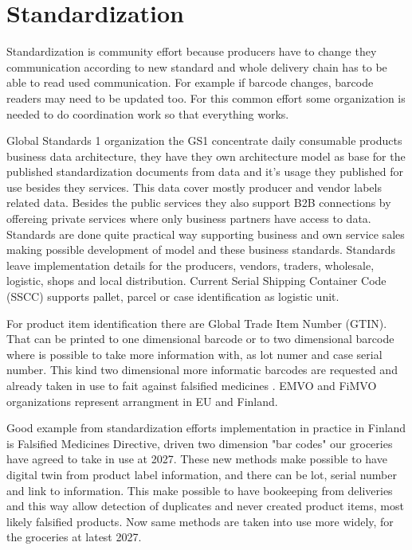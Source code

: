 \section{Standardization}
\label{standardization}
Standardization is community effort because producers have to change they
communication according to new standard and whole delivery chain has to be able
to read used communication. For example if barcode changes, barcode readers may
need to be updated too. For this common effort some organization is needed to
do coordination work so that everything works.

Global Standards 1 organization the GS1\cite{GS1Standards} concentrate daily
consumable products business data architecture, they have they own architecture
model as base for the published standardization documents from data and it's
usage they published for use besides they services. This data cover mostly
producer and vendor labels related data. Besides the public services they also
support B2B connections by offereing private services where only business
partners have access to data. Standards are done quite practical way supporting
business and own service sales making possible development of model and these
business standards. Standards leave implementation details for the producers,
vendors, traders, wholesale, logistic, shops and local distribution. Current
Serial Shipping Container Code (SSCC)\cite{SSCC} supports pallet, parcel or
case identification as logistic unit.

For product item identification there are Global Trade Item Number
(GTIN)\cite{GTIN}. That can be printed to one dimensional barcode or to two
dimensional barcode where is possible to take more information with, as
lot numer and case serial number. This kind two dimensional more informatic
barcodes are requested and already taken in use to fait against falsified
medicines \cite{FalsifiedMedicines}. EMVO\cite{EMVO} and FiMVO\cite{FiMVO}
organizations represent arrangment in EU and Finland.

Good example from standardization efforts implementation in practice in
Finland is Falsified Medicines
Directive\cite{Falsified_Medicines_Directive}\cite{FalsifiedMedicines}\cite{EMVO}\cite{FiMVO},
driven two dimension "bar codes" our groceries have agreed to take in use at
2027\cite{GS1DL2027}\cite{Finland2DcodesY27}. These new methods make possible
to have digital twin from product label information, and there can be lot,
serial number and link to information. This make possible to have bookeeping
from deliveries and this way allow detection of duplicates and never created
product items, most likely falsified products. Now same methods are taken into
use more widely, for the groceries at latest 2027.

